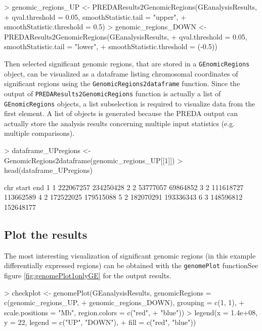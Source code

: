 \documentclass[a4paper,10pt]{article}
\begin{document}
\begin{Schunk}
\begin{Sinput}
> genomic_regions_UP <- PREDAResults2GenomicRegions(GEanalysisResults, 
+     qval.threshold = 0.05, smoothStatistic.tail = "upper", 
+     smoothStatistic.threshold = 0.5)
> genomic_regions_DOWN <- PREDAResults2GenomicRegions(GEanalysisResults, 
+     qval.threshold = 0.05, smoothStatistic.tail = "lower", 
+     smoothStatistic.threshold = (-0.5))
\end{Sinput}
\end{Schunk}


Then selected significant genomic regions, that are stored in a \texttt{GEnomicRegions} object, can be visualized as a dataframe listing chromosomal coordinates of significant regions using the \texttt{GenomicRegions2dataframe} function. Since the output of \texttt{PREDAResults2GenomicRegions} function is actually a list of \texttt{GEnomicRegions} objects, a list subselection is required to visualize data from the first element. A list of objects is generated because the PREDA output can actually store the analysis results concerning multiple input statistics (e.g. multiple comparisons).

\begin{Schunk}
\begin{Sinput}
> dataframe_UPregions <- GenomicRegions2dataframe(genomic_regions_UP[[1]])
> head(dataframe_UPregions)
\end{Sinput}
\begin{Soutput}
  chr     start       end
1   1 222067257 234250428
2   2  53777057  69864852
3   2 111618727 113662589
4   2 172522025 179515088
5   2 182070291 193336343
6   3 148596812 152648177
\end{Soutput}
\end{Schunk}


\subsection{Plot the results}

The most interesting visualization of significant genomic regions (in this example differentially expressed regions) can be obtained with the \texttt{genomePlot} functionSee figure \ref{fig:genomePlot1onlyGE} for the output results.

\begin{Schunk}
\begin{Sinput}
> checkplot <- genomePlot(GEanalysisResults, genomicRegions = c(genomic_regions_UP, 
+     genomic_regions_DOWN), grouping = c(1, 1), 
+     scale.positions = "Mb", region.colors = c("red", 
+         "blue"))
> legend(x = 1.4e+08, y = 22, legend = c("UP", "DOWN"), 
+     fill = c("red", "blue"))
\end{Sinput}
\end{Schunk}
\end{document}
